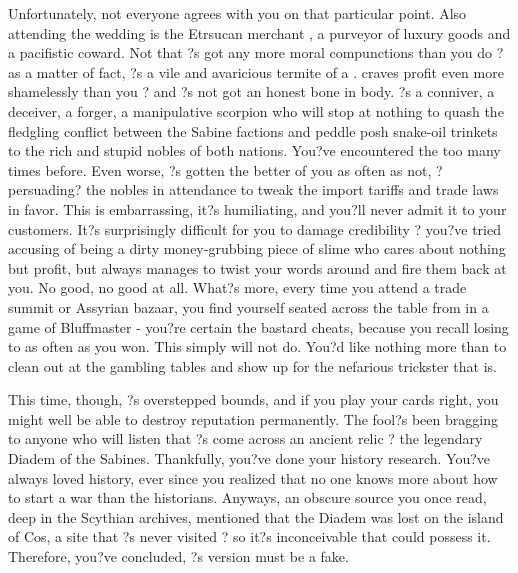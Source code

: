 \documentclass[char]{Kos}
\begin{document}
Unfortunately, not everyone agrees with you on that particular point. Also attending the wedding is the Etrsucan merchant \cMerchant{}, a purveyor of luxury goods and a pacifistic coward. Not that \cMerchant{}?s got any more moral compunctions than you do ? as a matter of fact, \cMerchant{\they}?s a vile and avaricious termite of a \cMerchant{\human}. \cMerchant{\They} craves profit even more shamelessly than you ? and \cMerchant{\they}?s not got an honest bone in \cMerchant{\their} body. \cMerchant{\They}?s a conniver, a deceiver, a forger, a manipulative scorpion who will stop at nothing to quash the fledgling conflict between the Sabine factions and peddle \cMerchant{\their} posh snake-oil trinkets to the rich and stupid nobles of both nations. You?ve encountered the \cMerchant{\human} too many times before. Even worse, \cMerchant{\they}?s gotten the better of you as often as not, ?persuading? the nobles in attendance to tweak the import tariffs and trade laws in \cMerchant{\their} favor. This is embarrassing, it?s humiliating, and you?ll never admit it to your customers. It?s surprisingly difficult for you to damage \cMerchant{\their} credibility ? you?ve tried accusing \cMerchant{\them} of being a dirty money-grubbing piece of slime who cares about nothing but profit, but \cMerchant{\they} always manages to twist your words around and fire them back at you. No good, no good at all. What?s more, every time you attend a trade summit or Assyrian bazaar, you find yourself seated across the table from \cMerchant{\them} in a game of Bluffmaster - you?re certain the bastard cheats, because you recall losing to \cMerchant{\them} as often as you won. This simply will not do. You?d like nothing more than to clean \cMerchant{} out at the gambling tables and show \cMerchant{\them} up for the nefarious trickster that \cMerchant{\they} is.

This time, though, \cMerchant{}?s overstepped \cMerchant{\their} bounds, and if you play your cards right, you might well be able to destroy \cMerchant{\their} reputation permanently. The fool?s been bragging to anyone who will listen that \cMerchant{\they}?s come across an ancient relic ? the legendary Diadem of the Sabines. Thankfully, you?ve done your history research. You?ve always loved history, ever since you realized that no one knows more about how to start a war than the historians. Anyways, an obscure source you once read, deep in the Scythian archives, mentioned that the Diadem was lost on the island of Cos, a site that \cMerchant{}?s never visited ? so it?s inconceivable that \cMerchant{\they} could possess it. Therefore, you?ve concluded, \cMerchant{}?s version must be a fake. 
\end{document}
